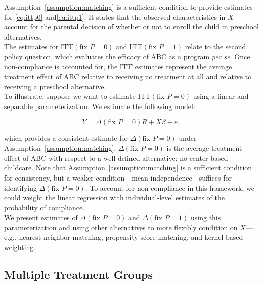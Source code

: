 \noindent Assumption~\ref{assumption:matching} is a sufficient condition to provide estimates for \eqref{eq:ittp0} and\eqref{eq:ittp1}. It states that the observed characteristics in $X$ account for the parental decision of whether or not to enroll the child in preschool alternatives.\\

\noindent The estimates for $\text{ITT} \left( \text{fix } P = 0 \right) $ and $\text{ITT} \left( \text{fix } P = 1 \right)$ relate to the second policy question, which evaluates the efficacy of ABC as a program \emph{per se}. Once non-compliance is accounted for, the ITT estimates represent the average treatment effect of ABC relative to receiving no treatment at all and relative to receiving a preschool alternative.\\

\noindent To illustrate, suppose we want to estimate $\text{ITT} \left( \text{fix } P = 0 \right)$ using a linear and separable parameterization. We estimate the following model: 

\begin{equation}
Y = \Delta \left( \text{fix } P = 0 \right) R + X \beta + \varepsilon, 
\end{equation}

\noindent which provides a consistent estimate for $\Delta \left( \text{fix } P = 0 \right)$ under Assumption~\ref{assumption:matching}. $\Delta \left( \text{fix } P = 0 \right)$ is the average treatment effect of ABC with respect to a well-defined alternative: no center-based childcare. Note that Assumption~\ref{assumption:matching} is a sufficient condition for consistency, but a weaker condition---mean independence---suffices for identifying $\Delta \left( \text{fix } P = 0 \right)$. To account for non-compliance in this framework, we could weight the linear regression with individual-level estimates of the probability of compliance.\\

\noindent We present estimates of $\Delta \left( \text{fix } P = 0 \right)$ and $\Delta \left( \text{fix } P = 1 \right)$ using this parameterization and using other alternatives to more flexibly  condition on $X$---e.g., nearest-neighbor matching, propensity-score matching, and kernel-based weighting.

\subsection{Multiple Treatment Groups}

